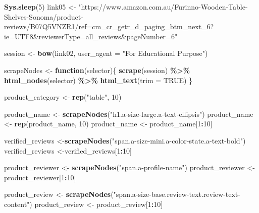 \documentclass[
]{article}
\newenvironment{Shaded}{\begin{snugshade}}{\end{snugshade}}
\newcommand{\AttributeTok}[1]{\textcolor[rgb]{0.13,0.29,0.53}{#1}}
\newcommand{\ConstantTok}[1]{\textcolor[rgb]{0.56,0.35,0.01}{#1}}
\newcommand{\ControlFlowTok}[1]{\textcolor[rgb]{0.13,0.29,0.53}{\textbf{#1}}}
\newcommand{\DecValTok}[1]{\textcolor[rgb]{0.00,0.00,0.81}{#1}}
\newcommand{\FunctionTok}[1]{\textcolor[rgb]{0.13,0.29,0.53}{\textbf{#1}}}
\newcommand{\NormalTok}[1]{#1}
\newcommand{\OtherTok}[1]{\textcolor[rgb]{0.56,0.35,0.01}{#1}}
\newcommand{\SpecialCharTok}[1]{\textcolor[rgb]{0.81,0.36,0.00}{\textbf{#1}}}
\newcommand{\StringTok}[1]{\textcolor[rgb]{0.31,0.60,0.02}{#1}}
\begin{document}
\begin{Shaded}
\begin{Highlighting}[]
   \FunctionTok{Sys.sleep}\NormalTok{(}\DecValTok{5}\NormalTok{)}
\NormalTok{link05 }\OtherTok{\textless{}{-}} \StringTok{"https://www.amazon.com.au/Furinno{-}Wooden{-}Table{-}Shelves{-}Sonoma/product{-}reviews/B07Q5VNZR1/ref=cm\_cr\_getr\_d\_paging\_btm\_next\_6?ie=UTF8\&reviewerType=all\_reviews\&pageNumber=6"}


\NormalTok{  session }\OtherTok{\textless{}{-}} \FunctionTok{bow}\NormalTok{(link02,}
               \AttributeTok{user\_agent =} \StringTok{"For Educational Purpose"}\NormalTok{)}

\NormalTok{  scrapeNodes }\OtherTok{\textless{}{-}} \ControlFlowTok{function}\NormalTok{(selector)\{}
    \FunctionTok{scrape}\NormalTok{(session) }\SpecialCharTok{\%\textgreater{}\%}
      \FunctionTok{html\_nodes}\NormalTok{(selector) }\SpecialCharTok{\%\textgreater{}\%}
      \FunctionTok{html\_text}\NormalTok{(}\AttributeTok{trim =} \ConstantTok{TRUE}\NormalTok{)}
\NormalTok{  \}}

\NormalTok{  product\_category }\OtherTok{\textless{}{-}} \FunctionTok{rep}\NormalTok{(}\StringTok{"table"}\NormalTok{, }\DecValTok{10}\NormalTok{)}

\NormalTok{  product\_name }\OtherTok{\textless{}{-}} \FunctionTok{scrapeNodes}\NormalTok{(}\StringTok{"h1.a{-}size{-}large.a{-}text{-}ellipsis"}\NormalTok{)}
\NormalTok{  product\_name }\OtherTok{\textless{}{-}} \FunctionTok{rep}\NormalTok{(product\_name, }\DecValTok{10}\NormalTok{)}
\NormalTok{  product\_name }\OtherTok{\textless{}{-}}\NormalTok{ product\_name[}\DecValTok{1}\SpecialCharTok{:}\DecValTok{10}\NormalTok{]}
  
\NormalTok{  verified\_reviews }\OtherTok{\textless{}{-}}\FunctionTok{scrapeNodes}\NormalTok{(}\StringTok{"span.a{-}size{-}mini.a{-}color{-}state.a{-}text{-}bold"}\NormalTok{)}
\NormalTok{  verified\_reviews }\OtherTok{\textless{}{-}}\NormalTok{verified\_reviews[}\DecValTok{1}\SpecialCharTok{:}\DecValTok{10}\NormalTok{]}
  
\NormalTok{  product\_reviewer }\OtherTok{\textless{}{-}} \FunctionTok{scrapeNodes}\NormalTok{(}\StringTok{"span.a{-}profile{-}name"}\NormalTok{)}
\NormalTok{  product\_reviewer }\OtherTok{\textless{}{-}}\NormalTok{ product\_reviewer[}\DecValTok{1}\SpecialCharTok{:}\DecValTok{10}\NormalTok{]}
  
\NormalTok{  product\_review }\OtherTok{\textless{}{-}} \FunctionTok{scrapeNodes}\NormalTok{(}\StringTok{"span.a{-}size{-}base.review{-}text.review{-}text{-}content"}\NormalTok{)}
\NormalTok{  product\_review }\OtherTok{\textless{}{-}}\NormalTok{ product\_review[}\DecValTok{1}\SpecialCharTok{:}\DecValTok{10}\NormalTok{]}
  

\end{Highlighting}
\end{Shaded}
\end{document}
